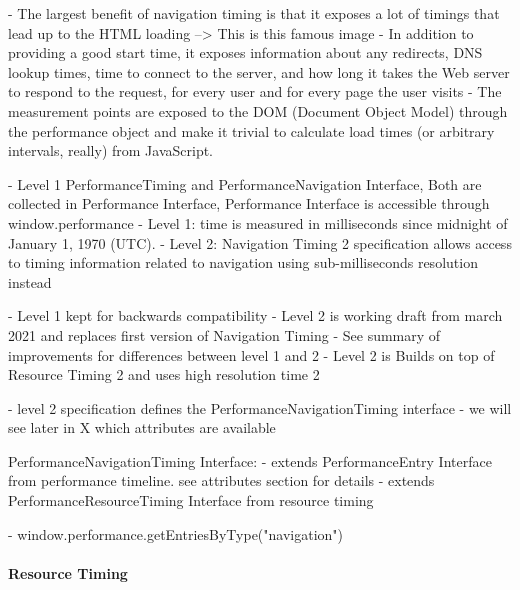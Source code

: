 - The largest benefit of navigation timing is that it exposes a lot of timings that lead up to the HTML loading --> This is this famous image
- In addition to providing a good start time, it exposes information about any redirects, DNS lookup times, time to connect to the server, and how long it takes the Web server to respond to the request, for every user and for every page the user visits
- The measurement points are exposed to the DOM (Document Object Model) through the performance object and make it trivial to calculate load times (or arbitrary intervals, really) from JavaScript.




- Level 1 PerformanceTiming and PerformanceNavigation Interface, Both are collected in Performance Interface, Performance Interface is accessible through window.performance
- Level 1: time is measured in milliseconds since midnight of January 1, 1970 (UTC).
- Level 2: Navigation Timing 2 specification allows access to timing information related to navigation using sub-milliseconds resolution instead


- Level 1 kept for backwards compatibility
- Level 2 is working draft from march 2021 and replaces first version of Navigation Timing
- See summary of improvements for differences between level 1 and 2
- Level 2 is Builds on top of Resource Timing 2 and uses high resolution time 2



- level 2 specification defines the PerformanceNavigationTiming interface
- we will see later in X which attributes are available


PerformanceNavigationTiming Interface: 
- extends PerformanceEntry Interface from performance timeline. see attributes section for details
- extends PerformanceResourceTiming Interface from resource timing


- window.performance.getEntriesByType("navigation")






\paragraph{Resource Timing}



